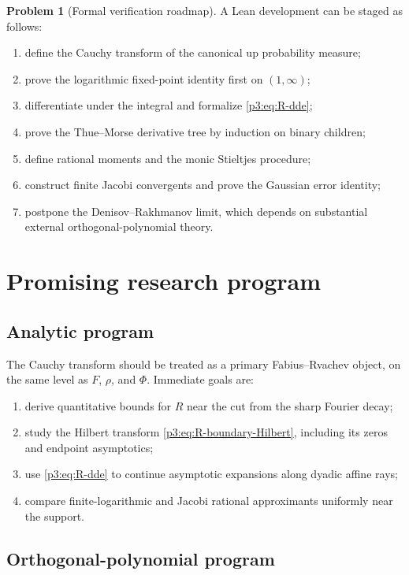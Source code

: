 \documentclass[11pt]{article}
\theoremstyle{definition}
\newtheorem{problem}[theorem]{Problem}
\theoremstyle{remark}
\begin{document}
\begin{problem}[Formal verification roadmap]
A Lean development can be staged as follows:
\begin{enumerate}
\item define the Cauchy transform of the canonical up probability measure;
\item prove the logarithmic fixed-point identity first on \((1,\infty)\);
\item differentiate under the integral and formalize \eqref{p3:eq:R-dde};
\item prove the Thue--Morse derivative tree by induction on binary children;
\item define rational moments and the monic Stieltjes procedure;
\item construct finite Jacobi convergents and prove the Gaussian error identity;
\item postpone the Denisov--Rakhmanov limit, which depends on substantial external
      orthogonal-polynomial theory.
\end{enumerate}
\end{problem}

\section{Promising research program}

\subsection{Analytic program}

The Cauchy transform should be treated as a primary Fabius--Rvachev object, on the same
level as \(F\), \(\rho\), and \(\Phi\).  Immediate goals are:

\begin{enumerate}
\item derive quantitative bounds for \(R\) near the cut from the sharp Fourier decay;
\item study the Hilbert transform \eqref{p3:eq:R-boundary-Hilbert}, including its zeros and
      endpoint asymptotics;
\item use \eqref{p3:eq:R-dde} to continue asymptotic expansions along dyadic affine rays;
\item compare finite-logarithmic and Jacobi rational approximants uniformly near the
      support.
\end{enumerate}

\subsection{Orthogonal-polynomial program}
\end{document}

